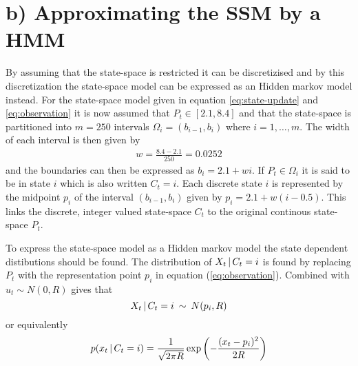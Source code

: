 \section*{b) Approximating the SSM by a HMM}
%
By assuming that the state-space is restricted it can be discretizised and by this discretization the state-space model can be expressed as an Hidden markov model instead. For the state-space model given in equation \ref{eq:state-update} and \ref{eq:observation} it is now assumed that $P_t\in[2.1,8.4]$ and that the state-space is partitioned into $m=250$ intervals $\Omega_i=(b_{i-1},b_i)$ where $i=1,\dots,m$. The width of each interval is then given by
\begin{align*}
    w = \frac{8.4 - 2.1}{250} = 0.0252
\end{align*}
and the boundaries can then be expressed as $b_i = 2.1 + wi$. If $P_t\in\Omega_i$ it is said to be in state $i$ which is also written $C_t=i$. Each discrete state $i$ is represented by the midpoint $p_i$ of the interval $(b_{i-1},b_i)$ given by $p_i = 2.1 + w(i-0.5)$. This links the discrete, integer valued state-space $C_t$ to the original continous state-space $P_t$.

To express the state-space model as a Hidden markov model the state dependent distibutions should be found. The distribution of $X_t\,|\, C_t=i$ is found by replacing $P_t$ with the representation point $p_i$ in equation (\ref{eq:observation}). Combined with $u_t\sim N(0,R)$ gives that 
%
\begin{equation*}
    X_t\,|\, C_t=i\:\sim\: N(p_i, R)
\end{equation*}
%
or equivalently
%
\begin{equation*}
    p(x_t\,|\, C_t=i) = \frac{1}{\sqrt{2\pi R}}\exp\left(-\frac{(x_t - p_i)^2}{2R}\right)
\end{equation*}

